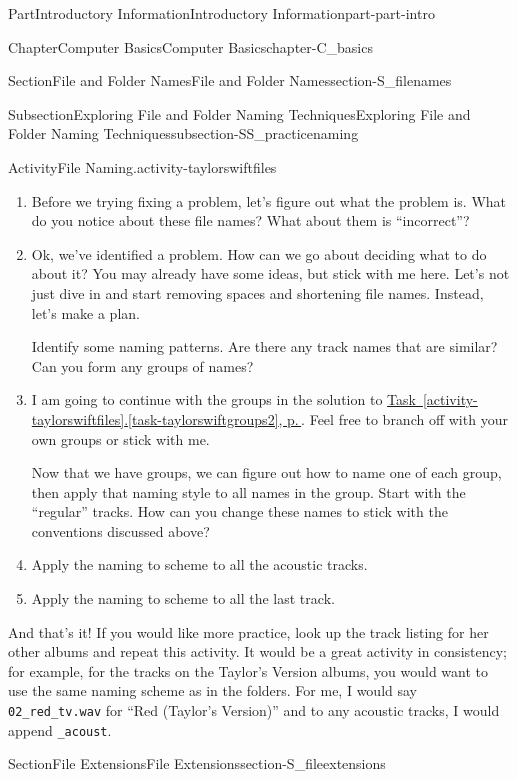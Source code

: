 \documentclass[twoside,10pt,]{book}
\newcommand{\xreffont}{\relax}
\newcommand{\mono}[1]{\texttt{#1}}
\begin{document}
\begin{partptx}{Part}{Introductory Information}{}{Introductory Information}{}{}{part-part-intro}
\begin{chapterptx}{Chapter}{Computer Basics}{}{Computer Basics}{}{}{chapter-C_basics}
\begin{sectionptx}{Section}{File and Folder Names}{}{File and Folder Names}{}{}{section-S_filenames}
\begin{subsectionptx}{Subsection}{Exploring File and Folder Naming Techniques}{}{Exploring File and Folder Naming Techniques}{}{}{subsection-SS_practicenaming}
\begin{activity}{Activity}{File Naming.}{activity-taylorswiftfiles}
\begin{enumerate}[font=\bfseries,label=(\alph*),ref=\alph*]
\item{}Before we trying fixing a problem, let's figure out what the problem is. What do you notice about these file names? What about them is ``incorrect''?%
\item\label{task-taylorswiftgroups2}Ok, we've identified a problem. How can we go about deciding what to do about it? You may already have some ideas, but stick with me here. Let's not just dive in and start removing spaces and shortening file names. Instead, let's make a plan.%
\par
Identify some naming patterns. Are there any track names that are similar? Can you form any groups of names?%
\item{}I am going to continue with the groups in the solution to \hyperref[task-taylorswiftgroups2]{Task~{\xreffont\ref{activity-taylorswiftfiles}}.{\xreffont\ref{task-taylorswiftgroups2}}, p.\,\pageref{task-taylorswiftgroups2}}. Feel free to branch off with your own groups or stick with me.%
\par
Now that we have groups, we can figure out how to name one of each group, then apply that naming style to all names in the group. Start with the ``regular'' tracks. How can you change these names to stick with the conventions discussed above?%
\item{}Apply the naming to scheme to all the acoustic tracks.%
\item{}Apply the naming to scheme to all the last track.%
\end{enumerate}%
And that's it! If you would like more practice, look up the track listing for her other albums and repeat this activity. It would be a great activity in consistency; for example, for the tracks on the Taylor's Version albums, you would want to use the same naming scheme as in the folders. For me, I would say \mono{02\_red\_tv.wav} for ``Red (Taylor's Version)'' and to any acoustic tracks, I would append \mono{\_acoust}.%
\end{activity}%
\end{subsectionptx}
\end{sectionptx}
%
%
\typeout{************************************************}
\typeout{************************************************}
%
\begin{sectionptx}{Section}{File Extensions}{}{File Extensions}{}{}{section-S_fileextensions}
%
\begin{introduction}{}%

\end{introduction}
\end{sectionptx}
\end{chapterptx}
\end{partptx}
\end{document}
